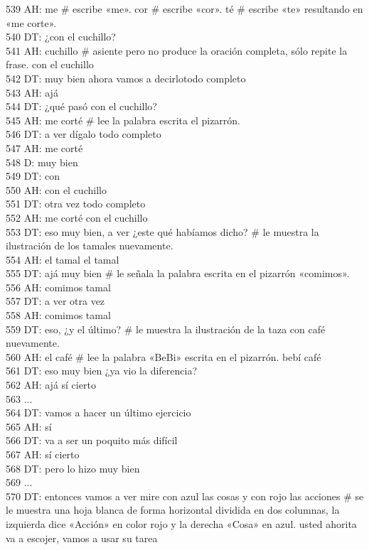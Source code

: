 539 AH: me \# escribe «me». cor \# escribe «cor». té \# escribe «te» resultando en «me corte».\\
540 DT: ¿con el cuchillo?\\
541 AH: cuchillo \# asiente pero no produce la oración completa, sólo repite la frase. con el cuchillo\\
542 DT: muy bien ahora vamos a decirlotodo completo\\
543 AH: ajá\\
544 DT: ¿qué pasó con el cuchillo?\\
545 AH: me corté \# lee la palabra escrita el pizarrón.\\
546 DT: a ver dígalo todo completo\\
547 AH: me corté\\
548 D: muy bien\\
549 DT: con\\
550 AH: con el cuchillo\\
551 DT: otra vez todo completo\\
552 AH: me corté con el cuchillo\\
553 DT: eso muy bien, a ver ¿este qué habíamos dicho? \# le muestra la ilustración  de los tamales nuevamente.\\
554 AH: el tamal el tamal\\
555 DT: ajá muy bien \# le señala la palabra escrita en el pizarrón «comimos».\\
556 AH: comimos tamal\\
557 DT: a ver otra vez\\
558 AH: comimos tamal\\
559 DT: eso, ¿y el último? \# le muestra la ilustración de la taza con café nuevamente.\\
560 AH: el café \# lee la palabra «BeBi» escrita en el pizarrón. bebí café\\
561 DT: eso muy bien ¿ya vio la diferencia?\\
562 AH: ajá sí cierto\\
563 ...\\
564 DT: vamos a hacer un último ejercicio\\
565 AH: sí\\
566 DT: va a ser un poquito más difícil\\
567 AH: sí cierto\\
568 DT: pero lo hizo muy bien\\
569 ...\\
570 DT: entonces vamos a ver mire con azul las cosas y con rojo las acciones \# se le muestra una hoja blanca de forma horizontal dividida en dos columnas, la izquierda dice «Acción» en color rojo y la derecha «Cosa» en azul. usted ahorita va a escojer, vamos a usar su tarea\\
